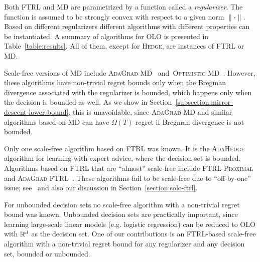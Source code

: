 Both \textsc{FTRL} and \textsc{MD} are parametrized by a function called a
\emph{regularizer}. The function is assumed to be strongly convex with respect
to a given norm $\|\cdot\|$. Based on different regularizers different
algorithms with different properties can be instantiated. A summary of
algorithms for OLO is presented in Table~\ref{table:results}.  All of them,
except for \textsc{Hedge}, are instances of \textsc{FTRL} or \textsc{MD}.

Scale-free versions of \textsc{MD} include \textsc{AdaGrad
MD}~\cite{Duchi-Hazan-Singer-2011} and~\textsc{Optimistic
MD}~\cite{Rakhlin-Sridharan-2013}. However, these algorithms have non-trivial
regret bounds only when the Bregman divergence associated with the regularizer
is bounded, which happens only when the decision is bounded as well. As we show
in Section~\ref{subsection:mirror-descent-lower-bound}, this is unavoidable,
since \textsc{AdaGrad MD} and similar algorithms based on \textsc{MD} can have
$\Omega(T)$ regret if Bregman divergence is not bounded.

Only one scale-free algorithm based on \textsc{FTRL} was known. It is the
\textsc{AdaHedge}~\cite{de-Rooij-van-Erven-Grunwald-Koolen-2014} algorithm for
learning with expert advice, where the decision set is bounded.
Algorithms based on \textsc{FTRL} that are ``almost'' scale-free include
\textsc{FTRL-Proximal}~\cite{McMahan-Streeter-2010,McMahan-2014} and
\textsc{AdaGrad FTRL}~\cite{Duchi-Hazan-Singer-2011}.  These algorithms fail to
be scale-free due to ``off-by-one'' issue; see~\cite{McMahan-2014} and also our
discussion in Section~\ref{section:solo-ftrl}.

For unbounded decision sets no scale-free algorithm with a non-trivial regret
bound was known. Unbounded decision sets are practically important, since
learning large-scale linear models (e.g. logistic regression) can be reduced to
OLO with $\mathbb{R}^d$ as the decision set. One of our contributions is an
\textsc{FTRL}-based scale-free algorithm with a non-trivial regret bound for
any regularizer and any decision set, bounded or unbounded.


